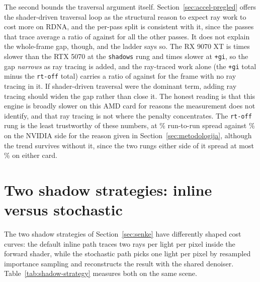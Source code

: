 The second bounds the traversal argument itself. Section~\ref{sec:accel-pregled} offers the
shader-driven traversal loop as the structural reason to expect ray work to cost more on RDNA, and
the per-pass split is consistent with it, since the passes that trace average a ratio of \perfVendorTracingMean{} against
\perfVendorOtherMean{} for all the other passes. It does not explain the whole-frame gap, though, and the
ladder says so. The RX 9070 XT is \perfLadderRatioShadows{} times slower than the RTX 5070 at the \texttt{shadows} rung
and \perfLadderRatioGi{} times slower at \texttt{+gi}, so the gap \emph{narrows} as ray tracing is added, and the
ray-traced work alone (the \texttt{+gi} total minus the \texttt{rt-off} total) carries a ratio of
\perfRtOnlyRatio{} against \perfLadderRatioBase{} for the frame with no ray tracing in it. If shader-driven traversal were the
dominant term, adding ray tracing should widen the gap rather than close it. The honest reading is
that this engine is broadly slower on this AMD card for reasons the measurement does not identify,
and that ray tracing is not where the penalty concentrates. The \texttt{rt-off} rung is the least
trustworthy of these numbers, at \perfSpreadBaseAMD{}\% run-to-run spread against \perfSpreadBaseNV{}\% on the NVIDIA side for the
reason given in Section~\ref{sec:metodologija}, although the trend survives without it, since the two
rungs either side of it spread at most \perfSpreadNeighbourMax{}\% on either card.

\section{Two shadow strategies: inline versus stochastic}
\label{sec:analiza-shadow-strategy}

The two shadow strategies of Section~\ref{sec:senke} have differently shaped cost curves: the default
inline path traces two rays per light per pixel inside the forward shader, while the stochastic path
picks one light per pixel by resampled importance sampling and reconstructs the result with the
shared denoiser. Table~\ref{tab:shadow-strategy} measures both on the same scene.

\begin{table}[tbp]
\caption[Inline versus stochastic shadow cost]{Two shadow strategies on the same scene with five enabled lights (GPU ms, delta over
\texttt{rt-off}).}
\label{tab:shadow-strategy}
\centering

\end{table}

